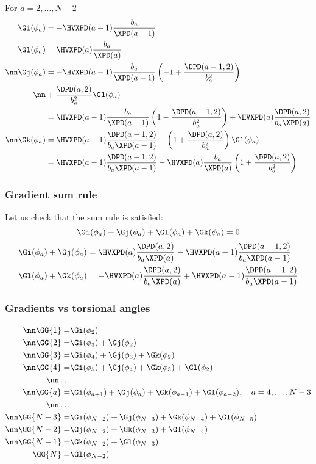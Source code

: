 For $a=2,\ldots,N-2$
\begin{align}
  \label{my-Gi}
  \Gi(\phi_a)&=-\HVXPD(a-1)\frac{b_{a}}{\XPD(a-1)}  \\
  \label{my-Gl}
  \Gl(\phi_a)&=\HVXPD(a)\frac{b_{a}}{\XPD(a)} \\
  \nn\Gj(\phi_a)&=-\HVXPD(a-1)\frac{b_{a}}{\XPD(a-1)}
  \left(-1+\frac{\DPD(a-1,2)}{b_a^2}\right)\\
  \nn&+\frac{\DPD(a,2)}{b_a^2}\Gl(\phi_a)\\
  \label{my-Gj}
  &=\HVXPD(a-1)\frac{b_{a}}{\XPD(a-1)}\left(1-\frac{\DPD(a-1,2)}{b_a^2}\right)
  +\HVXPD(a)\frac{\DPD(a,2)}{b_a\XPD(a)}\\
  \nn\Gk(\phi_a)&=\HVXPD(a-1)\frac{\DPD(a-1,2)}{b_a\XPD(a-1)}-\left(1+\frac{\DPD(a,2)}{b_a^2}\right)\Gl(\phi_a)\\
  \label{my-Gk}
  &=\HVXPD(a-1)\frac{\DPD(a-1,2)}{b_a\XPD(a-1)}-
  \HVXPD(a)\frac{b_{a}}{\XPD(a)}\left(1+\frac{\DPD(a,2)}{b_a^2}\right)
\end{align}

\subsubsection{Gradient sum rule}
Let us check that the sum rule is satisfied:
\begin{equation}
  \Gi(\phi_a)+\Gj(\phi_a)+\Gl(\phi_a)+\Gk(\phi_a)=0
\end{equation}
\begin{align}
\Gi(\phi_a)+\Gj(\phi_a)&=\HVXPD(a)\frac{\DPD(a,2)}{b_a\XPD(a)}-
\HVXPD(a-1)\frac{\DPD(a-1,2)}{b_a\XPD(a-1)}\\
\Gl(\phi_a)+\Gk(\phi_a)&=-\HVXPD(a)\frac{\DPD(a,2)}{b_a\XPD(a)}+
\HVXPD(a-1)\frac{\DPD(a-1,2)}{b_a\XPD(a-1)}
\end{align}

\clearpage
\subsubsection{Gradients vs torsional angles}

\begin{align}
  \nn\GG{1}=&\Gi(\phi_2)\\
  \nn\GG{2}=&\Gi(\phi_3)+\Gj(\phi_2)\\
  \nn\GG{3}=&\Gi(\phi_4)+\Gj(\phi_3)+\Gk(\phi_2)\\
  \nn\GG{4}=&\Gi(\phi_5)+\Gj(\phi_4)+\Gk(\phi_3)+\Gl(\phi_2)\\
  \nn\ldots\\
  \nn\GG{a}=&\Gi(\phi_{a+1})+\Gj(\phi_a)+\Gk(\phi_{a-1})+\Gl(\phi_{a-2}),\quad a=4,\ldots,N-3\\
  \nn\ldots\\
  \nn\GG{N-3}=&\Gi(\phi_{N-2})+\Gj(\phi_{N-3})+\Gk(\phi_{N-4})+\Gl(\phi_{N-5})\\
  \nn\GG{N-2}=&\Gj(\phi_{N-2})+\Gk(\phi_{N-3})+\Gl(\phi_{N-4})\\
  \nn\GG{N-1}=&\Gk(\phi_{N-2})+\Gl(\phi_{N-3})\\
  \GG{N}=&\Gl(\phi_{N-2})
\end{align}

